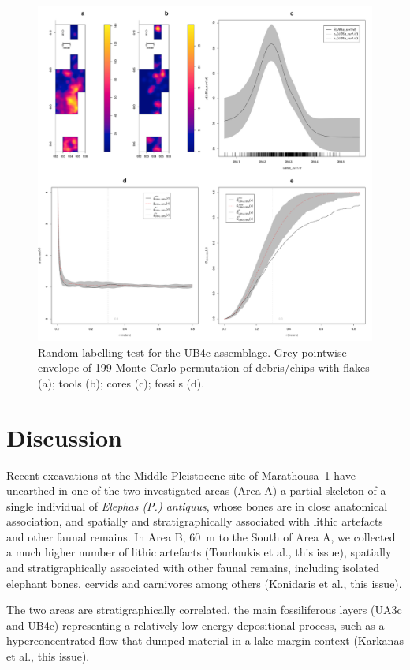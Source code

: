\documentclass[preprint,authoryear,times]{elsarticle} %
\begin{document}
\begin{figure}[]
  \centering
  \includegraphics[width=1\textwidth]{../artwork/Fig11.pdf}
  \caption{Random labelling test for the UB4c assemblage. Grey pointwise envelope of 199 Monte Carlo permutation of debris/chips with flakes (a); tools (b); cores (c); fossils (d).}
  \label{fig:11}
\end{figure}

\section{Discussion}

Recent excavations at the Middle Pleistocene site of Marathousa~1 have unearthed in one of the two investigated areas (Area A) a partial skeleton of a single individual of \emph{Elephas (P.) antiquus}, whose bones are in close anatomical association, and spatially and stratigraphically associated with lithic artefacts and other faunal remains. In Area B, 60~m to the South of Area A, we collected a much higher number of lithic artefacts (Tourloukis et al., this issue), spatially and stratigraphically associated with other faunal remains, including isolated elephant bones, cervids and carnivores among others (Konidaris et al., this issue).

The two areas are stratigraphically correlated, the main fossiliferous layers (UA3c and UB4c) representing a relatively low-energy depositional process, such as a hyperconcentrated flow that dumped material in a lake margin context (Karkanas et al., this issue).
\end{document}
